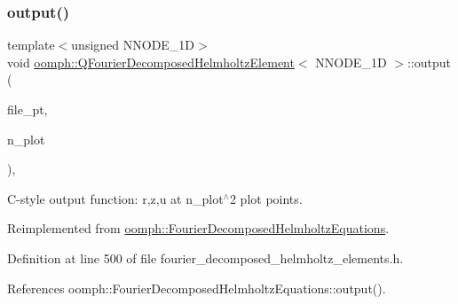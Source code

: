 \subsubsection{\texorpdfstring{output()}{output()}\hspace{0.1cm}{\footnotesize\ttfamily [4/4]}}
{\footnotesize\ttfamily template$<$unsigned N\+N\+O\+D\+E\+\_\+1D$>$ \\
void \hyperlink{classoomph_1_1QFourierDecomposedHelmholtzElement}{oomph\+::\+Q\+Fourier\+Decomposed\+Helmholtz\+Element}$<$ N\+N\+O\+D\+E\+\_\+1D $>$\+::output (\begin{DoxyParamCaption}\item[{F\+I\+LE $\ast$}]{file\+\_\+pt,  }\item[{const unsigned \&}]{n\+\_\+plot }\end{DoxyParamCaption})\hspace{0.3cm}{\ttfamily [inline]}, {\ttfamily [virtual]}}



C-\/style output function\+: r,z,u at n\+\_\+plot$^\wedge$2 plot points. 



Reimplemented from \hyperlink{classoomph_1_1FourierDecomposedHelmholtzEquations_a1cd04195d40d3d411cda8f0323fc2e7b}{oomph\+::\+Fourier\+Decomposed\+Helmholtz\+Equations}.



Definition at line 500 of file fourier\+\_\+decomposed\+\_\+helmholtz\+\_\+elements.\+h.



References oomph\+::\+Fourier\+Decomposed\+Helmholtz\+Equations\+::output().

\mbox{\label{classoomph_1_1QFourierDecomposedHelmholtzElement_a4ad5327722a3094908a1141e640a4c1e}} 
